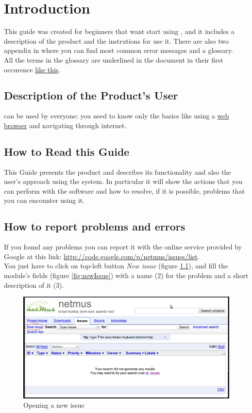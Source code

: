 \tableofcontents

\chapter{Introduction}
\thispagestyle{fancy} %
This guide was created for beginners that want start using , and it
includes a description of the product and the instrutions for use it. There are
also two appendix in where you can find most common error messages and a
glossary.\\

All the terms in the glossary are underlined in the document in their first
occurence \underline{like this}.

\section{Description of the Product's User}
 can be used by everyone: you need to know only the basics like using
a \underline{web browser} and navigating through internet. 


\section{How to Read this Guide}
This Guide presents the product  and describes its functionality and
also the user's approach using the system. In particular it will show the 
actions that you can perform with the software and how to resolve, if it is
possible, problems that you can encounter using it.

\section{How to report problems and errors}
If you found any problems you can report it with the online service provided by
Google at this link:  \url{http://code.google.com/p/netmus/issues/list}.\\
You just have to click on top-left button \emph{New issue} (figure
\ref{fig:issues}), and fill the module's
fields (figure \ref{fig:newIssue}) with a name (2) for the problem and a short description of it (3). 

\begin{figure}[!htbp]
  \centering
  \includegraphics[width=16cm]{img/MU/issues.png}
\caption{Opening a new issue}
\label{fig:issues}
\end{figure}

